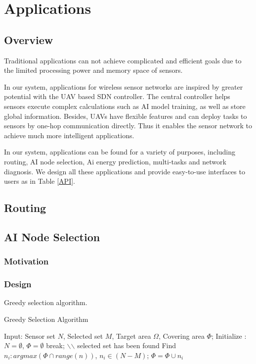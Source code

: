 \section{Applications}

\subsection{Overview}

Traditional applications can not achieve complicated and efficient goals due 
to the limited processing power and memory space of sensors.

In our system, applications for wireless sensor networks are inspired by 
greater potential with the UAV based SDN controller. The central controller
helps sensors execute complex calculations such as AI model training, as well 
as store global information. Besides, UAVs have flexible features and can deploy 
tasks to sensors by one-hop communication directly. Thus it enables the sensor network
to achieve much more intelligent applications.

In our system, applications can be found for a variety of purposes, including routing, AI node selection,
Ai energy prediction, multi-tasks and network diagnosis. We design all these applications and provide 
easy-to-use interfaces to users as in Table \ref{API}.



\subsection{Routing}

\subsection{AI Node Selection}

\subsubsection{Motivation}

\subsubsection{Design}

Greedy selection algorithm.

\begin{algorithm}
\caption{Greedy Selection Algorithm}
\label{Greedy}
\begin{algorithmic}[1]
\STATE Input: Sensor set $N$, Selected set $M$, Target area $\Omega$, Covering area $\Phi$;
\STATE Initialize : $N = \emptyset$, $\Phi = \emptyset$
    \IF{$\Phi = \Omega $}
        \STATE break; $\backslash$$\backslash$ selected set has been found
    \ENDIF
    \STATE Find $n_i : argmax(\Phi \cap range(n))$, $n_i \in (N-M)$;
    \STATE $\Phi = \Phi \cup {n_i}$
\ENDWHILE
\end{algorithmic}
\end{algorithm}

